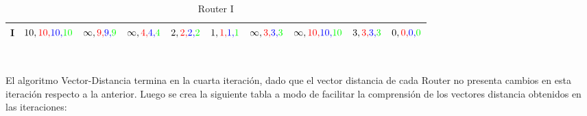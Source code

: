 \documentclass[a4paper,10pt]{article}
\begin{document}
\begin{table}[H]
\begin{tabular}{|c|c|c|c|c|c|c|c|c|c|}
I & $10,{\color{red}10,}{\color{blue}10,}{\color{green}10} $ & $\infty,{\color{red}9,}{\color{blue}9,}{\color{green}9} $ & $\infty,{\color{red}4,}{\color{blue}4,}{\color{green}4} $ & $2,{\color{red}2,}{\color{blue}2,}{\color{green}2} $ & $1,{\color{red}1,}{\color{blue}1,}{\color{green}1} $ & $ \infty,{\color{red}3,}{\color{blue}3,}{\color{green}3}$ & $\infty,{\color{red}10,}{\color{blue}10,}{\color{green}10} $ & $3,{\color{red}3,}{\color{blue}3,}{\color{green}3} $ & $0,{\color{red}0,}{\color{blue}0,}{\color{green}0} $ \\\hline
\end{tabular}
\caption{Router I}
\end{table} \\


\raggedright El algoritmo Vector-Distancia termina en la cuarta iteración, dado que el vector distancia de cada Router no presenta cambios en esta iteración respecto a la anterior. Luego se crea la siguiente tabla a modo de facilitar la comprensión de los vectores distancia obtenidos en las iteraciones:
\end{document}
